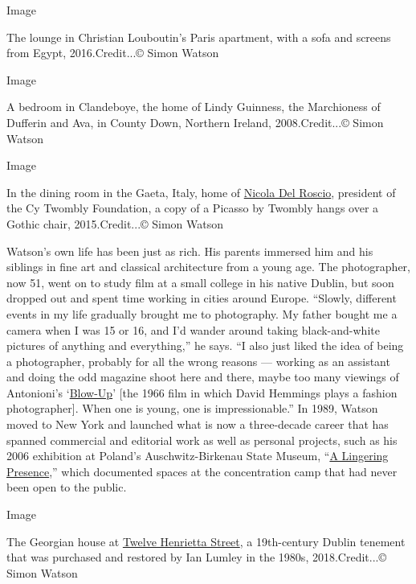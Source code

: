 Image

The lounge in Christian Louboutin's Paris apartment, with a sofa and
screens from Egypt, 2016.Credit...© Simon Watson

Image

A bedroom in Clandeboye, the home of Lindy Guinness, the Marchioness of
Dufferin and Ava, in County Down, Northern Ireland, 2008.Credit...©
Simon Watson

Image

In the dining room in the Gaeta, Italy, home of
\href{https://www.nytimes3xbfgragh.onion/2015/03/26/t-magazine/nicola-del-roscio-cy-twombly-gaeta-cultivating-genius.html}{Nicola
Del Roscio}, president of the Cy Twombly Foundation, a copy of a Picasso
by Twombly hangs over a Gothic chair, 2015.Credit...© Simon Watson

Watson's own life has been just as rich. His parents immersed him and
his siblings in fine art and classical architecture from a young age.
The photographer, now 51, went on to study film at a small college in
his native Dublin, but soon dropped out and spent time working in cities
around Europe. ``Slowly, different events in my life gradually brought
me to photography. My father bought me a camera when I was 15 or 16, and
I'd wander around taking black-and-white pictures of anything and
everything,'' he says. ``I also just liked the idea of being a
photographer, probably for all the wrong reasons --- working as an
assistant and doing the odd magazine shoot here and there, maybe too
many viewings of Antonioni's
`\href{https://www.nytimes3xbfgragh.onion/2017/07/19/movies/blow-up-michaelangelo-antonioni-film-forum.html}{Blow-Up}'
{[}the 1966 film in which David Hemmings plays a fashion
photographer{]}. When one is young, one is impressionable.'' In 1989,
Watson moved to New York and launched what is now a three-decade career
that has spanned commercial and editorial work as well as personal
projects, such as his 2006 exhibition at Poland's Auschwitz-Birkenau
State Museum,
``\href{http://www.simonwatson.com/projects/a-lingering-presence/}{A
Lingering Presence},'' which documented spaces at the concentration camp
that had never been open to the public.

Image

The Georgian house at
\href{https://www.nytimes3xbfgragh.onion/2018/09/10/t-magazine/henrietta-street-dublin-building-history-design.html}{Twelve
Henrietta Street}, a 19th-century Dublin tenement that was purchased and
restored by Ian Lumley in the 1980s, 2018.Credit...© Simon Watson


